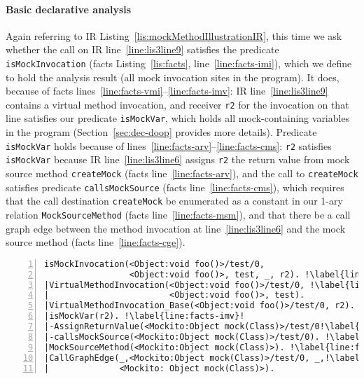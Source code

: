 \paragraph{Basic declarative analysis} Again referring to IR Listing~\ref{lis:mockMethodIllustrationIR}, this time we ask whether the call on IR line~\ref{line:lis3line9} satisfies the predicate \texttt{isMockInvocation} (facts Listing~\ref{lis:facts}, line~\ref{line:facts-imi}), which we define to hold the analysis result (all mock invocation sites in the program). It does, because of facts lines~\ref{line:facts-vmi}--\ref{line:facts-imv}: IR line~\ref{line:lis3line9} contains a virtual method invocation, and receiver \texttt{r2} for the invocation on that line satisfies our predicate \texttt{isMockVar}, which holds all mock-containing variables in the program (Section~\ref{sec:dec-doop} provides more details). Predicate \texttt{isMockVar} holds because of lines~\ref{line:facts-arv}--\ref{line:facts-cms}: \texttt{r2} satisfies \texttt{isMockVar} because IR line~\ref{line:lis3line6} assigns \texttt{r2} the return value from mock source method \texttt{createMock} (facts line~\ref{line:facts-arv}), and the call to \texttt{createMock} satisfies predicate \texttt{callsMockSource} (facts line~\ref{line:facts-cms}), which requires that the call destination \texttt{createMock} be enumerated as a constant in our 1-ary relation \texttt{MockSourceMethod} (facts line~\ref{line:facts-msm}), and that there be a call graph edge between the method invocation at line~\ref{line:lis3line6} and the mock source method (facts line~\ref{line:facts-cge}).


\begin{lstlisting}[basicstyle=\ttfamily, caption={Facts about invocation \texttt{r2.foo()} in method \texttt{test}.},
numbers=left,numbersep=2pt,basicstyle=\scriptsize\ttfamily, framesep=4.5mm, framexleftmargin=1.0mm, captionpos=b, label=lis:facts, escapechar=!, morekeywords={@Test}]
isMockInvocation(<Object:void foo()>/test/0, 
                 <Object:void foo()>, test, _, r2). !\label{line:facts-imi}!
|VirtualMethodInvocation(<Object:void foo()>/test/0, !\label{line:facts-vmi}!
|                        <Object:void foo()>, test).
|VirtualMethodInvocation_Base(<Object:void foo()>/test/0, r2).
|isMockVar(r2). !\label{line:facts-imv}!
|-AssignReturnValue(<Mockito:Object mock(Class)>/test/0!\label{line:facts-arv}!, r2).
|-callsMockSource(<Mockito:Object mock(Class)>/test/0). !\label{line:facts-cms}!
|MockSourceMethod(<Mockito:Object mock(Class)>). !\label{line:facts-msm}!
|CallGraphEdge(_,<Mockito:Object mock(Class)>/test/0, _,!\label{line:facts-cge}!
|              <Mockito: Object mock(Class)>). 
\end{lstlisting}


